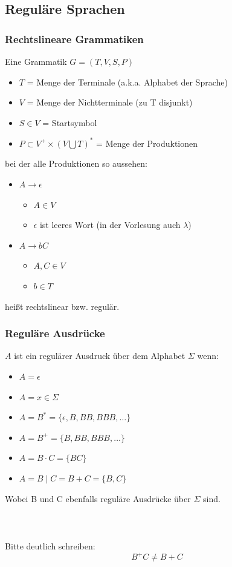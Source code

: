 \subsection{Reguläre Sprachen}
\begin{frame}
\frametitle{Rechtslineare Grammatiken}
Eine Grammatik $G = ( T, V, S, P)$
\begin{itemize}
	\item $T$ = Menge der Terminale (a.k.a. Alphabet der Sprache)
	\item $V$ = Menge der Nichtterminale (zu T disjunkt)
	\item $S \in V$ = Startsymbol
	\item $P \subset V^{+} \times (V \bigcup T)^{*}$ = Menge der Produktionen
\end{itemize}
bei der alle Produktionen so aussehen:
\begin{itemize}
	\item $A \rightarrow \epsilon$
	\begin{itemize}
		\item $A \in V$
		\item $\epsilon$ ist leeres Wort (in der Vorlesung auch $\lambda$)
	\end{itemize}
	\item $A \rightarrow bC$
	\begin{itemize}
		\item $A, C \in V$
		\item $b \in T$
	\end{itemize}
\end{itemize}
heißt rechtslinear bzw. regulär. 
\end{frame}

\begin{frame}
\frametitle{Reguläre Ausdrücke}
$A$ ist ein regulärer Ausdruck über dem Alphabet $\Sigma$ wenn:
\begin{itemize}
	\item $A = \epsilon$
	\item $A = x \in \Sigma$
	\item $A = B^{*} = \{\epsilon, B, BB, BBB, \ldots\}$
	\item $A = B^{+} = \{B, BB, BBB, \ldots\}$
	\item $A = B \cdot C = \{BC\}$
	\item $A = B \mid C = B + C = \{B, C\}$
\end{itemize}
Wobei B und C ebenfalls reguläre Ausdrücke über $\Sigma$ sind.
~\\~\\~\\~\\

Bitte deutlich schreiben:
\begin{equation*}
B^{+}C \neq B + C
\end{equation*}
\end{frame}

